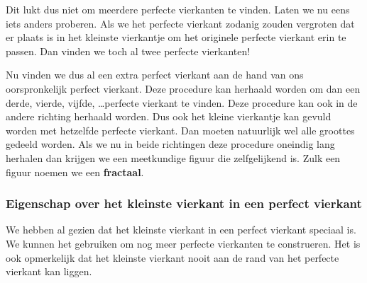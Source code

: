 

\begin{center}
  
\end{center}

Dit lukt dus niet om meerdere perfecte vierkanten te vinden. Laten we nu eens iets anders proberen. Als we het perfecte vierkant zodanig zouden vergroten dat er plaats is in het kleinste vierkantje om het originele perfecte vierkant erin te passen. Dan vinden we toch al twee perfecte vierkanten!



Nu vinden we dus al een extra perfect vierkant aan de hand van ons oorspronkelijk perfect vierkant. Deze procedure kan herhaald worden om dan een derde, vierde, vijfde, \ldots perfecte vierkant te vinden. Deze procedure kan ook in de andere richting herhaald worden. Dus ook het kleine vierkantje kan gevuld worden met hetzelfde perfecte vierkant. Dan moeten natuurlijk wel alle groottes gedeeld worden. Als we nu in beide richtingen deze procedure oneindig lang herhalen dan krijgen we een meetkundige figuur die zelfgelijkend is. Zulk een figuur noemen we een {\bf fractaal}.

\subsubsection{Eigenschap over het kleinste vierkant in een perfect vierkant}

We hebben al gezien dat het kleinste vierkant in een perfect vierkant speciaal is. We kunnen het gebruiken om nog meer perfecte vierkanten te construeren. Het is ook opmerkelijk dat het kleinste vierkant nooit aan de rand van het perfecte vierkant kan liggen.


